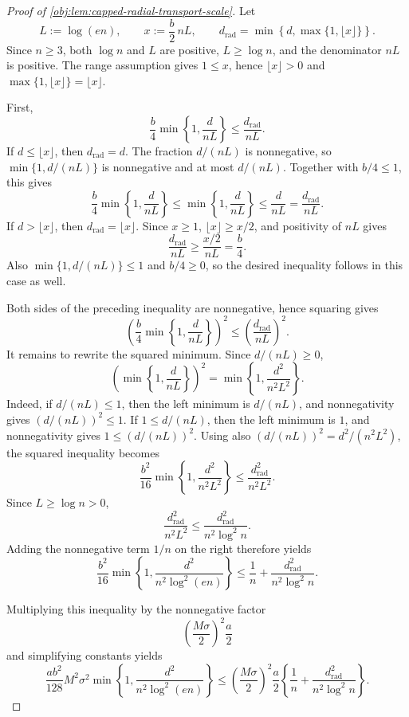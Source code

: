 \begin{proof}[Proof of \cref{obj:lem:capped-radial-transport-scale}]
Let
\[
L:=\log(en),
\qquad
x:=\frac b2\,nL,
\qquad
d_{\mathrm{rad}}
=
\min\left\{d,\max\{1,\lfloor x\rfloor\}\right\}.
\]
Since \(n\ge3\), both \(\log n\) and \(L\) are positive, \(L\ge\log n\), and the denominator \(nL\) is positive. The range assumption gives \(1\le x\), hence \(\lfloor x\rfloor>0\) and \(\max\{1,\lfloor x\rfloor\}=\lfloor x\rfloor\). %

First,
\[
\frac b4\min\left\{1,\frac d{nL}\right\}
\le
\frac{d_{\mathrm{rad}}}{nL}.
\]
If \(d\le\lfloor x\rfloor\), then \(d_{\mathrm{rad}}=d\). The fraction \(d/(nL)\) is nonnegative, so \(\min\{1,d/(nL)\}\) is nonnegative and at most \(d/(nL)\). Together with \(b/4\le1\), this gives
\[
\frac b4\min\left\{1,\frac d{nL}\right\}
\le
\min\left\{1,\frac d{nL}\right\}
\le
\frac d{nL}
=
\frac{d_{\mathrm{rad}}}{nL}.
\]
If \(d>\lfloor x\rfloor\), then \(d_{\mathrm{rad}}=\lfloor x\rfloor\). Since \(x\ge1\), \(\lfloor x\rfloor\ge x/2\), and positivity of \(nL\) gives
\[
\frac{d_{\mathrm{rad}}}{nL}
\ge
\frac{x/2}{nL}
=
\frac b4.
\]
Also \(\min\{1,d/(nL)\}\le1\) and \(b/4\ge0\), so the desired inequality follows in this case as well. %

Both sides of the preceding inequality are nonnegative, hence squaring gives
\[
\left(
\frac b4\min\left\{1,\frac d{nL}\right\}
\right)^2
\le
\left(\frac{d_{\mathrm{rad}}}{nL}\right)^2.
\]
It remains to rewrite the squared minimum. Since \(d/(nL)\ge0\),
\[
\left(\min\left\{1,\frac d{nL}\right\}\right)^2
=
\min\left\{1,\frac{d^2}{n^2L^2}\right\}.
\]
Indeed, if \(d/(nL)\le1\), then the left minimum is \(d/(nL)\), and nonnegativity gives \((d/(nL))^2\le1\). If \(1\le d/(nL)\), then the left minimum is \(1\), and nonnegativity gives \(1\le(d/(nL))^2\). Using also \((d/(nL))^2=d^2/(n^2L^2)\), the squared inequality becomes
\[
\frac{b^2}{16}
\min\left\{1,\frac{d^2}{n^2L^2}\right\}
\le
\frac{d_{\mathrm{rad}}^2}{n^2L^2}.
\]
Since \(L\ge\log n>0\),
\[
\frac{d_{\mathrm{rad}}^2}{n^2L^2}
\le
\frac{d_{\mathrm{rad}}^2}{n^2\log^2 n}.
\]
Adding the nonnegative term \(1/n\) on the right therefore yields
\[
\frac{b^2}{16}
\min\left\{1,\frac{d^2}{n^2\log^2(en)}\right\}
\le
\frac1n+
\frac{d_{\mathrm{rad}}^2}{n^2\log^2 n}.
\]

Multiplying this inequality by the nonnegative factor
\[
\left(\frac{M\sigma}{2}\right)^2\frac a2
\]
and simplifying constants yields
\[
\frac{ab^2}{128}M^2\sigma^2
\min\left\{1,\frac{d^2}{n^2\log^2(en)}\right\}
\le
\left(\frac{M\sigma}{2}\right)^2
\frac a2
\left\{
\frac1n+
\frac{d_{\mathrm{rad}}^2}{n^2\log^2 n}
\right\}.
\]
\end{proof}
